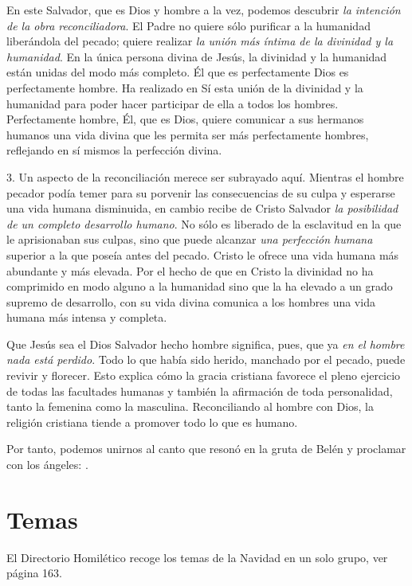 En este Salvador, que es Dios y hombre a la vez, podemos descubrir \emph{la intención de la obra reconciliadora}. El Padre no quiere sólo purificar a la humanidad liberándola del pecado; quiere realizar \emph{la unión más íntima de la divinidad y la humanidad}. En la única persona divina de Jesús, la divinidad y la humanidad están unidas del modo más completo. Él que es perfectamente Dios es perfectamente hombre. Ha realizado en Sí esta unión de la divinidad y la humanidad para poder hacer participar de ella a todos los hombres. Perfectamente hombre, Él, que es Dios, quiere comunicar a sus hermanos humanos una vida divina que les permita ser más perfectamente hombres, reflejando en sí mismos la perfección divina.

3. Un aspecto de la reconciliación merece ser subrayado aquí. Mientras el hombre pecador podía temer para su porvenir las consecuencias de su culpa y esperarse una vida humana disminuida, en cambio recibe de Cristo Salvador \emph{la posibilidad de un completo desarrollo humano}. No sólo es liberado de la esclavitud en la que le aprisionaban sus culpas, sino que puede alcanzar \emph{una perfección humana} superior a la que poseía antes del pecado. Cristo le ofrece una vida humana más abundante y más elevada. Por el hecho de que en Cristo la divinidad no ha comprimido en modo alguno a la humanidad sino que la ha elevado a un grado supremo de desarrollo, con su vida divina comunica a los hombres una vida humana más intensa y completa.

Que Jesús sea el Dios Salvador hecho hombre significa, pues, que ya \emph{en el hombre nada está perdido}. Todo lo que había sido herido, manchado por el pecado, puede revivir y florecer. Esto explica cómo la gracia cristiana favorece el pleno ejercicio de todas las facultades humanas y también la afirmación de toda personalidad, tanto la femenina como la masculina. Reconciliando al hombre con Dios, la religión cristiana tiende a promover todo lo que es humano.

Por tanto, podemos unirnos al canto que resonó en la gruta de Belén y proclamar con los ángeles: .


\section{Temas}

El Directorio Homilético recoge los temas de la Navidad en un solo
grupo, ver página 163.

